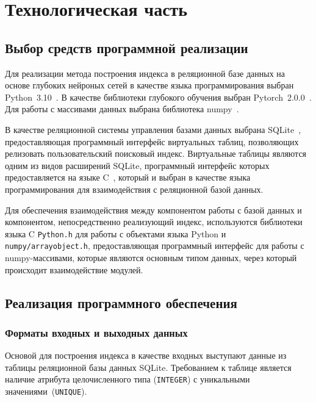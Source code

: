 \chapter{\label{impl}Технологическая часть}

\section{Выбор средств программной реализации}

Для реализации метода построения индекса в реляционной базе данных на основе
глубоких нейроных сетей в качестве языка программирования выбран
Python~3.10~\cite{python}. В качестве библиотеки глубокого обучения выбран
Pytorch~2.0.0~\cite{pytorch}.  Для работы с массивами данных выбрана библиотека
numpy~\cite{numpy}.

В качестве реляционной системы управления базами данных выбрана
SQLite~\cite{sqlite}, предоставляющая программный интерфейс виртуальных таблиц,
позволяющих релизовать пользовательский поисковый индекс. Виртуальные таблицы
являются одним из видов расширений SQLite, программный интерфейс которых
предоставляется на языке C~\cite{c}, который и выбран в качестве языка
программирования для взаимодействия с реляционной базой данных.

Для обеспечения взаимодействия между компонентом работы с базой данных и
компонентом, непосредственно реализующий индекс, используются библиотеки языка C
\texttt{Python.h} для работы с объектами языка Python и
\texttt{numpy/arrayobject.h}, предоставляющая программный интерфейс для работы с
numpy-массивами, которые являются основным типом данных, через который
происходит взаимодействие модулей.

\section{Реализация программного обеспечения}

\subsection{Форматы входных и выходных данных}

Основой для построения индекса в качестве входных выступают данные из таблицы
реляционной базы данных SQLite. Требованием к таблице является наличие атрибута
целочисленного типа (\texttt{INTEGER}) с уникальными
значениями~(\texttt{UNIQUE}).

